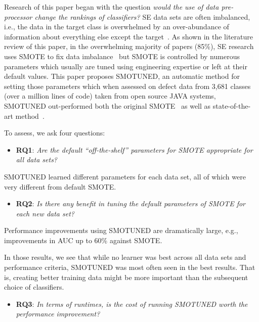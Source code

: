 \documentclass[sigconf]{acmart}
\newcommand{\bi}{\begin{itemize}[leftmargin=0.4cm]}
\newcommand{\ei}{\end{itemize}}
\theoremstyle{break}
\newcommand{\sma}{{\sc SMOTE}}
\newcommand{\smb}{{\sc SMOTUNED}}
\begin{document}
Research of this paper began with the question {\em would the use of
data pre-processor change the rankings of classifiers?}
SE data
sets are often imbalanced, i.e., the data in the target class is overwhelmed by an over-abundance of information about everything else except the target~\cite{menzies2007problems}.
As shown in the literature review of this paper, in the overwhelming majority of papers (85\%), SE research uses {\sma} to fix data imbalance~\cite{chawla2002smote} but {\sma} is controlled by numerous parameters which
usually are tuned using engineering expertise or left at their default
values. This paper proposes 
{\smb}, an automatic method for setting those parameters which when assessed on  defect data from 3,681	 classes (over a million lines of code) 
taken from open source JAVA systems,  {\smb} out-performed
both the original SMOTE~\cite{chawla2002smote} as well as state-of-the-art method~\cite{bennin2017mahakil}.

To assess, we ask four questions: 
 \bi\item
  \textbf{RQ1}:  {\em Are the default ``off-the-shelf'' parameters for {\sma} appropriate for
  all data sets?} 
  \ei
 \begin{lesson}{\smb} learned different parameters for each data set, all of which  were very different from default {\sma}.
 \end{lesson}
  \bi
  \item
  \textbf{RQ2}: {\em   Is  there any benefit in tuning the default parameters of {\sma} for
  each new data set?} 
  \ei
   \begin{lesson}Performance improvements using {\smb} are dramatically large, e.g., improvements in AUC up to 60\% against {\sma}.
 \end{lesson}
In those results, we see that  while no learner was best across all data sets and   performance criteria,
{\smb} was most often seen in the best results.
That is, creating better training data might be more important
than the subsequent choice of classifiers. 
 
  
   \bi
  \item
  \textbf{RQ3}: {\em  In terms of runtimes, is the cost of running {\smb} worth the performance improvement?}
  \ei
  
\end{document}

